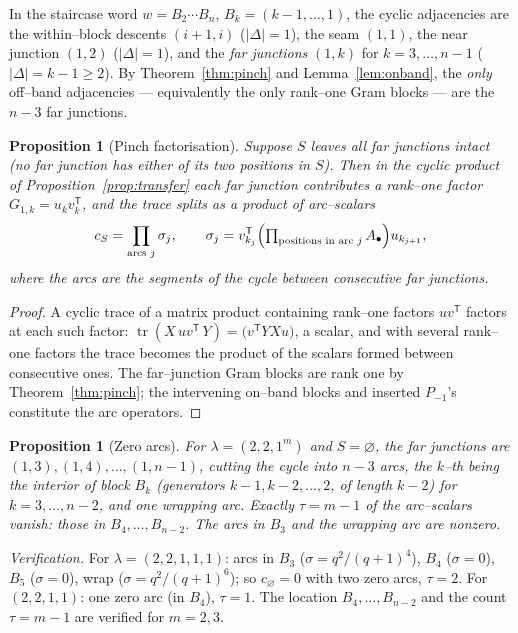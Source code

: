 \documentclass[11pt]{article}
\newtheorem{proposition}[theorem]{Proposition}
\theoremstyle{definition}
\DeclareMathOperator{\tr}{tr}
\newcommand{\Pm}{P_{-1}}
\newcommand{\la}{\lambda}
\begin{document}
In the staircase word $w=B_2\cdots B_n$, $B_k=(k-1,\dots,1)$, the cyclic adjacencies are
the within--block descents $(i{+}1,i)$ ($|\Delta|=1$), the seam $(1,1)$, the near junction
$(1,2)$ ($|\Delta|=1$), and the \emph{far junctions} $(1,k)$ for $k=3,\dots,n-1$
($|\Delta|=k-1\ge2$). By Theorem~\ref{thm:pinch} and Lemma~\ref{lem:onband}, the
\emph{only} off--band adjacencies --- equivalently the only rank--one Gram blocks --- are
the $n-3$ far junctions.

\begin{proposition}[Pinch factorisation]\label{prop:arcs}
Suppose $S$ leaves all far junctions intact (no far junction has either of its two
positions in $S$). Then in the cyclic product of Proposition~\ref{prop:transfer} each far
junction contributes a rank--one factor $G_{1,k}=u_k v_k^{\mathsf T}$, and the trace splits
as a product of \emph{arc--scalars}
\[
c_S=\prod_{\text{arcs }j} \sigma_j,\qquad
\sigma_j=v_{k_j}^{\mathsf T}\Bigl(\textstyle\prod_{\text{positions in arc }j}A_\bullet\Bigr)u_{k_{j+1}},
\]
where the arcs are the segments of the cycle between consecutive far junctions.
\end{proposition}

\begin{proof}
A cyclic trace of a matrix product containing rank--one factors $u v^{\mathsf T}$ factors at
each such factor: $\tr(X\,uv^{\mathsf T}\,Y)=\bigl(v^{\mathsf T}YX u\bigr)$, a scalar, and with
several rank--one factors the trace becomes the product of the scalars formed between
consecutive ones. The far--junction Gram blocks are rank one by Theorem~\ref{thm:pinch};
the intervening on--band blocks and inserted $\Pm$'s constitute the arc operators.
\end{proof}

\begin{proposition}[Zero arcs]\label{prop:zeroarcs}
For $\la=(2,2,1^m)$ and $S=\varnothing$, the far junctions are $(1,3),(1,4),\dots,(1,n-1)$,
cutting the cycle into $n-3$ arcs, the $k$--th being the interior of block $B_k$
(generators $k-1,k-2,\dots,2$, of length $k-2$) for $k=3,\dots,n-2$, and one wrapping arc.
Exactly $\tau=m-1$ of the arc--scalars vanish: those in $B_4,\dots,B_{n-2}$. The arcs in
$B_3$ and the wrapping arc are nonzero.
\end{proposition}

\noindent\emph{Verification.} For $\la=(2,2,1,1,1)$: arcs in $B_3$ ($\sigma=q^2/(q+1)^4$),
$B_4$ ($\sigma=0$), $B_5$ ($\sigma=0$), wrap ($\sigma=q^2/(q+1)^6$); so $c_\varnothing=0$
with two zero arcs, $\tau=2$. For $(2,2,1,1)$: one zero arc (in $B_4$), $\tau=1$. The
location $B_4,\dots,B_{n-2}$ and the count $\tau=m-1$ are verified for $m=2,3$.
\end{document}
